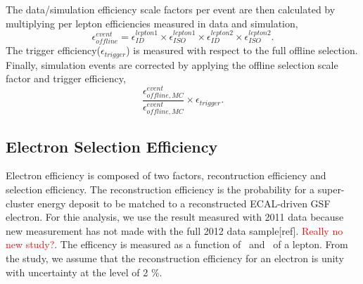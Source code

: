 The data/simulation efficiency scale factors per event are then calculated by 
multiplying per lepton efficiencies measured in data and simulation, 
\begin{equation} 
\epsilon_{offline}^{event} 
= 
\epsilon_{ID}^{lepton1} \times \epsilon_{ISO}^{lepton1}   
\times \epsilon_{ID}^{lepton2} \times \epsilon_{ISO}^{lepton2}.   
\end{equation} 
The trigger efficiency($\epsilon_{trigger}$) is measured with respect to the full 
offline selection. Finally, simulation events are corrected by applying the 
offline selection scale factor and trigger efficiency, 
\begin{equation} 
\frac{\epsilon_{offline, MC}^{event}}{\epsilon_{offline, MC}^{event}} 
\times \epsilon_{trigger}. 
\end{equation} 



\subsection{Electron Selection Efficiency}

Electron efficiency is composed of two factors, recontruction efficiency and 
selection efficiency. The reconstruction efficiency is the probability for a 
super-cluster energy deposit to be matched to a reconstructed ECAL-driven 
GSF electron. For thie analysis, we use the result measured with 2011 data   
because new measurement has not made with the full 2012 data sample[ref]. 
\textcolor{red}{Really no new study?}. The efficency is measured as a function 
of \pt~and \Eta~of a lepton. From the study, we assume that the reconstruction 
efficiency for an electron is unity with uncertainty at the level of 2 \%.

